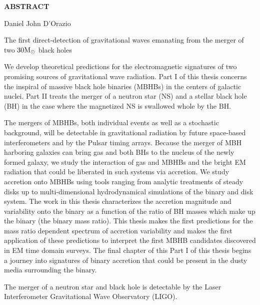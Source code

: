 \thispagestyle{empty}
\begin{center}

{\Large \bf ABSTRACT}

\vspace{.35in}
{\large \bf \thesistitle}

\vspace{.35in}

{\large Daniel John D'Orazio} \\
\vspace{.35in}
\end{center}
%
The first direct-detection of gravitational waves emanating from the merger of two $30 \mathrm{M}_\odot$ black holes 

We develop theoretical predictions for the electromagnetic signatures of two promising sources of gravitational wave radiation. Part I of this thesis concerns the inspiral of massive black hole binaries (MBHBs) in the centers of galactic nuclei. Part II treats the merger of a neutron star (NS) and a stellar black hole (BH) in the case where the magnetized NS is swallowed whole by the BH.

The mergers of MBHBs, both individual events as well as a stochastic background, will be detectable in gravitational radiation by future space-based interferometers and by the Pulsar timing arrays. Because the merger of MBH harboring galaxies can bring gas and both BHs to the nucleus of the newly formed galaxy, we study the interaction of gas and MBHBs and the bright EM radiation that could be liberated in such systems via accretion. We study accretion onto MBHBs using tools ranging from analytic treatments of steady disks up to multi-dimensional hydrodynamical simulations of the binary and disk system. The work in this thesis characterizes the accretion magnitude and variability onto the binary as a function of the ratio of BH masses which make up the binary (the binary mass ratio). This thesis makes the first predictions for the mass ratio dependent spectrum of accretion variability and makes the first application of these predictions to interpret the first MBHB candidates discovered in EM time domain surveys. The final chapter of this Part I of this thesis begins a journey into signatures of binary accretion that could be present in the dusty media surrounding the binary.

The merger of a neutron star and black hole is detectable by the Laser Interferometer Gravitational Wave Observatory (LIGO).  